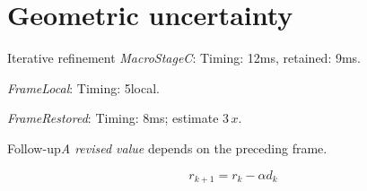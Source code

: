 \documentclass[9pt,aspectratio=169]{beamer}
\newcommand{\fuzzlayerA}[1]{\textit{#1}}
\newcommand{\fuzzlayerB}[1]{\fuzzlayerA{#1}}
\newcommand{\fuzzterm}[1]{\fuzzlayerB{#1}}
\newcommand{\fuzzpair}[2]{\fuzzterm{#1}: #2}
\newcommand{\fuzzunit}{ms}
\let\fuzzoriginalunit\fuzzunit
\newcommand{\fuzzcoefficient}{3}
\newcommand{\fuzzscale}[2][\fuzzcoefficient]{#1\,#2}
\begin{document}
\section{Geometric uncertainty}
\begin{frame}[t]{Iterative refinement}
\fuzzpair{MacroStageC}{Timing: 12\fuzzunit, retained: 9\fuzzoriginalunit.}\par
{\renewcommand{\fuzzunit}{local}\fuzzpair{FrameLocal}{Timing: 5\fuzzunit.}\par}
\fuzzpair{FrameRestored}{Timing: 8\fuzzunit; estimate $\fuzzscale{x}$.}\par
\begin{block}{Follow-up}\fuzzterm{A revised value} depends on the preceding frame.\end{block}
\[r_{k+1}=r_k-\alpha d_k\]
\end{frame}
\end{document}
